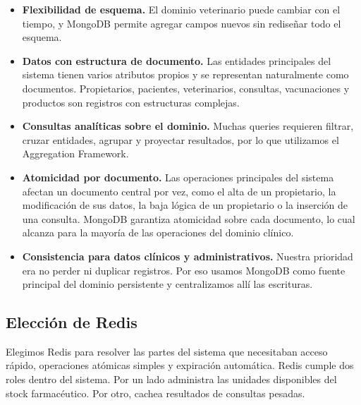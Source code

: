 \documentclass[10pt,a4paper]{article}
\begin{document}
\begin{itemize}
    \item \textbf{Flexibilidad de esquema.} El dominio veterinario puede cambiar con el tiempo, y MongoDB permite agregar campos nuevos sin rediseñar todo el esquema.

    \item \textbf{Datos con estructura de documento.} Las entidades principales del sistema tienen varios atributos propios y se representan naturalmente como documentos. Propietarios, pacientes, veterinarios, consultas, vacunaciones y productos son registros con estructuras complejas.

    \item \textbf{Consultas analíticas sobre el dominio.} Muchas queries requieren filtrar, cruzar entidades, agrupar y proyectar resultados, por lo que utilizamos el Aggregation Framework.

    \item \textbf{Atomicidad por documento.} Las operaciones principales del sistema afectan un documento central por vez, como el alta de un propietario, la modificación de sus datos, la baja lógica de un propietario o la inserción de una consulta. MongoDB garantiza atomicidad sobre cada documento, lo cual alcanza para la mayoría de las operaciones del dominio clínico.

    \item \textbf{Consistencia para datos clínicos y administrativos.} Nuestra prioridad era no perder ni duplicar registros. Por eso usamos MongoDB como fuente principal del dominio persistente y centralizamos allí las escrituras.
\end{itemize}

\subsection{Elección de Redis}

Elegimos Redis para resolver las partes del sistema que necesitaban acceso rápido, operaciones atómicas simples y expiración automática. Redis cumple dos roles dentro del sistema. Por un lado administra las unidades disponibles del stock farmacéutico. Por otro, cachea resultados de consultas pesadas.
\end{document}
